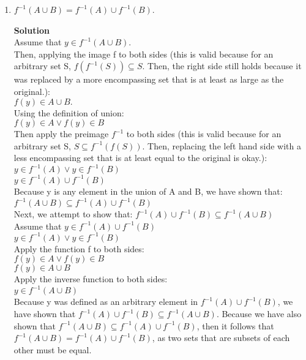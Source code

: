 \documentclass[11pt]{article}
\begin{document}
\begin{enumerate}

\item $f^{-1}(A \cup B) = f^{-1}(A) \cup f^{-1}(B)$.
\begin{mdframed} \textbf{Solution} \\
Assume that $y \in f^{-1}(A \cup B)$. \\
Then, applying the image f to both sides (this is valid because for an arbitrary set S, $f(f^{-1}(S)) \subseteq S$. Then, the right side still holds because it was replaced by a more encompassing set that is at least as large as the original.): \\
$f(y) \in A \cup B.$ \\
Using the definition of union: \\
$f(y) \in A \lor f(y) \in B$ \\
Then apply the preimage $f^{-1}$ to both sides (this is valid because for an arbitrary set S, $S \subseteq f^{-1}(f(S))$. Then, replacing the left hand side with a less encompassing set that is at least equal to the original is okay.): \\
$y \in f^{-1}(A) \lor y \in f^{-1}(B)$ \\
$y \in f^{-1}(A) \cup f^{-1}(B)$ \\
Because y is any element in the union of A and B, we have shown that: \\
$f^{-1}(A \cup B) \subseteq f^{-1}(A) \cup f^{-1}(B)$ \\
Next, we attempt to show that:
$f^{-1}(A) \cup f^{-1}(B) \subseteq f^{-1}(A \cup B)$ \\
Assume that $y \in f^{-1}(A) \cup f^{-1}(B)$ \\
$y \in f^{-1}(A) \lor y \in f^{-1}(B)$ \\
Apply the function f to both sides: \\
$f(y) \in A \lor f(y) \in B$ \\
$f(y) \in A \cup B$ \\
Apply the inverse function to both sides: \\
$y \in f^{-1}(A \cup B)$ \\
Because y was defined as an arbitrary element in $f^{-1}(A) \cup f^{-1}(B)$, we have shown that $f^{-1}(A) \cup f^{-1}(B) \subseteq f^{-1}(A \cup B)$. Because we have also shown that $f^{-1}(A \cup B) \subseteq f^{-1}(A) \cup f^{-1}(B)$, then it follows that $f^{-1}(A \cup B) = f^{-1}(A) \cup f^{-1}(B)$, as two sets that are subsets of each other must be equal.
\end{mdframed}


\end{enumerate}
\end{document}
